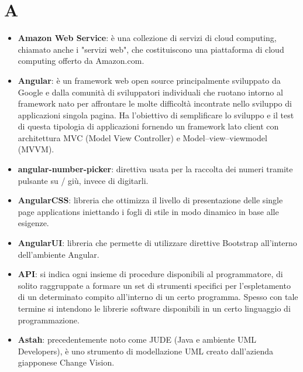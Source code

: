 \section{A}
\begin{itemize}
	\item
	\textbf{Amazon Web Service}: è una collezione di servizi di cloud computing, chiamato anche i "servizi web", che costituiscono una piattaforma di cloud computing offerto da Amazon.com.
	\item
	\textbf{Angular}: è un framework web open source principalmente sviluppato da Google e dalla comunità di sviluppatori individuali che ruotano intorno al framework nato per affrontare le molte difficoltà incontrate nello sviluppo di applicazioni singola pagina. Ha l'obiettivo di semplificare lo sviluppo e il test di questa tipologia di applicazioni fornendo un framework lato client con architettura MVC (Model View Controller) e Model–view–viewmodel (MVVM).
	\item
	\textbf{angular-number-picker}: direttiva usata per la raccolta dei numeri tramite pulsante su / giù, invece di digitarli.
	\item
	\textbf{AngularCSS}: libreria che ottimizza il livello di presentazione delle single page applications iniettando i fogli di stile in modo dinamico in base alle esigenze.
	\item 
	\textbf{AngularUI}: libreria che permette di utilizzare direttive Bootstrap all'interno dell'ambiente Angular.
	\item
	\textbf{API}: si indica ogni insieme di procedure disponibili al programmatore, di solito raggruppate a formare un set di strumenti specifici per l'espletamento di un determinato compito all'interno di un certo programma. Spesso con tale termine si intendono le librerie software disponibili in un certo linguaggio di programmazione.
	\item 
	\textbf{Astah}: precedentemente noto come JUDE (Java e ambiente UML Developers), è uno strumento di modellazione UML creato dall'azienda giapponese Change Vision.
\end{itemize}